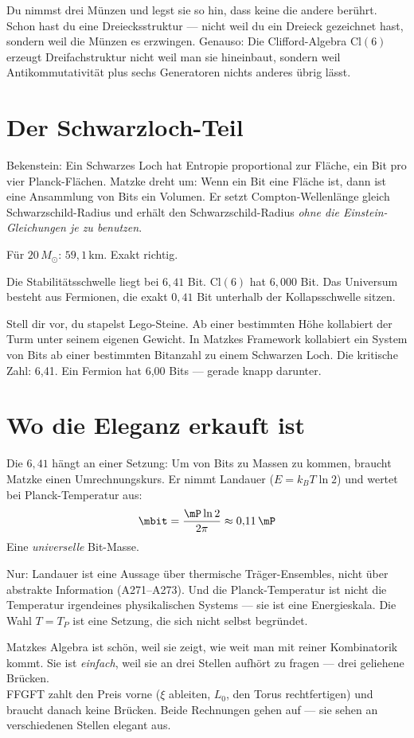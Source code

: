 \begin{laierspur}
Du nimmst drei Münzen und legst sie so hin, dass keine die andere berührt.
Schon hast du eine Dreiecksstruktur --- nicht weil du ein Dreieck gezeichnet
hast, sondern weil die Münzen es erzwingen. Genauso: Die Clifford-Algebra
$\mathrm{Cl}(6)$ erzeugt Dreifachstruktur nicht weil man sie hineinbaut,
sondern weil Antikommutativität plus sechs Generatoren nichts anderes
übrig lässt.
\end{laierspur}

\section{Der Schwarzloch-Teil}

Bekenstein: Ein Schwarzes Loch hat Entropie proportional zur Fläche, ein
Bit pro vier Planck-Flächen. Matzke dreht um: Wenn ein Bit eine Fläche ist,
dann ist eine Ansammlung von Bits ein Volumen. Er setzt Compton-Wellenlänge
gleich Schwarzschild-Radius und erhält den Schwarzschild-Radius
\emph{ohne die Einstein-Gleichungen je zu benutzen}. 

Für $20\,M_\odot$: $59{,}1$\,km. Exakt richtig.

Die Stabilitätsschwelle liegt bei $6{,}41$ Bit. $\mathrm{Cl}(6)$ hat $6{,}000$
Bit. Das Universum besteht aus Fermionen, die exakt $0{,}41$ Bit unterhalb
der Kollapsschwelle sitzen.

\begin{laierspur}
Stell dir vor, du stapelst Lego-Steine. Ab einer bestimmten Höhe
kollabiert der Turm unter seinem eigenen Gewicht. In Matzkes Framework
kollabiert ein System von Bits ab einer bestimmten Bitanzahl zu einem
Schwarzen Loch. Die kritische Zahl: 6,41. Ein Fermion hat 6,00 Bits ---
gerade knapp darunter.
\end{laierspur}

\section{Wo die Eleganz erkauft ist}

Die $6{,}41$ hängt an einer Setzung: Um von Bits zu Massen zu kommen,
braucht Matzke einen Umrechnungskurs. Er nimmt Landauer ($E = k_BT\ln 2$)
und wertet bei Planck-Temperatur aus:
\[
  \mbit = \frac{\mP \ln 2}{2\pi} \approx 0{,}11\,\mP
\]
Eine \emph{universelle} Bit-Masse. 

Nur: Landauer ist eine Aussage über thermische Träger-Ensembles, nicht
über abstrakte Information (A271--A273). Und die Planck-Temperatur ist
nicht die Temperatur irgendeines physikalischen Systems --- sie ist eine
Energieskala. Die Wahl $T = T_P$ ist eine Setzung, die sich nicht selbst
begründet.

\begin{keyresult}
Matzkes Algebra ist schön, weil sie zeigt, wie weit man mit reiner
Kombinatorik kommt. Sie ist \emph{einfach}, weil sie an drei Stellen
aufhört zu fragen --- drei geliehene Brücken.\\[4pt]
FFGFT zahlt den Preis vorne ($\xi$ ableiten, $L_0$, den Torus
rechtfertigen) und braucht danach keine Brücken. Beide Rechnungen
gehen auf --- sie sehen an verschiedenen Stellen elegant aus.
\end{keyresult}
